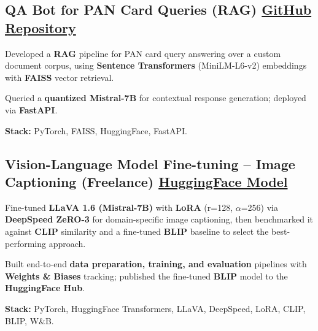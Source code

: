 \documentclass[letter,10pt]{article}
\begin{document}
\subsection{QA Bot for PAN Card Queries (RAG) \hfill \href{https://github.com/sunil448832/Natural-Language-Processing/tree/master/RAG(Retrieval\%20Augment\%20Generation)}{GitHub Repository}}
\begin{zitemize}
\item Developed a \textbf{RAG} pipeline for PAN card query answering over a custom document corpus, using \textbf{Sentence Transformers} (MiniLM-L6-v2) embeddings with \textbf{FAISS} vector retrieval.
\item Queried a \textbf{quantized Mistral-7B} for contextual response generation; deployed via \textbf{FastAPI}.
\item \textbf{Stack:} PyTorch, FAISS, HuggingFace, FastAPI.
\end{zitemize}

\subsection{Vision-Language Model Fine-tuning – Image Captioning (Freelance) \hfill \href{https://huggingface.co/sunil448832/blip-model}{HuggingFace Model}}
\begin{zitemize}
\item Fine-tuned \textbf{LLaVA 1.6 (Mistral-7B)} with \textbf{LoRA} (r=128, $\alpha$=256) via \textbf{DeepSpeed ZeRO-3} for domain-specific image captioning, then benchmarked it against \textbf{CLIP} similarity and a fine-tuned \textbf{BLIP} baseline to select the best-performing approach.
\item Built end-to-end \textbf{data preparation, training, and evaluation} pipelines with \textbf{Weights \& Biases} tracking; published the fine-tuned \textbf{BLIP} model to the \textbf{HuggingFace Hub}.
\item \textbf{Stack:} PyTorch, HuggingFace Transformers, LLaVA, DeepSpeed, LoRA, CLIP, BLIP, W\&B.
\end{zitemize}
\end{document}
